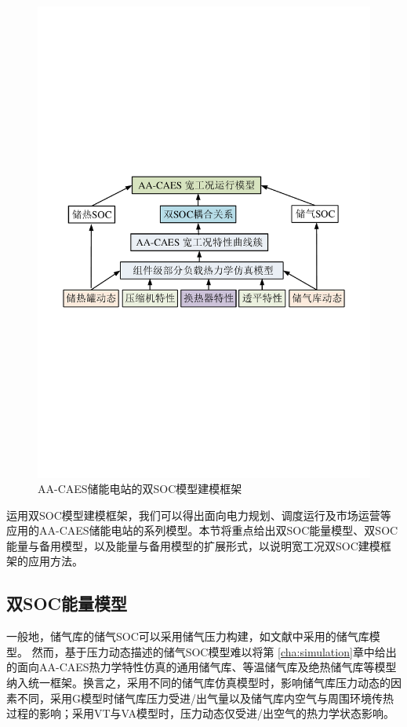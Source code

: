 \begin{figure}[H] %
  \centering
  \includegraphics[scale=0.60]{figures/Chap3-2-AA-CAES-Part-Load-Model.pdf}
  \caption{AA-CAES储能电站的双SOC模型建模框架}
  \label{fig:AA-CAES-Part-Load-Model}
\end{figure}

运用双SOC模型建模框架，我们可以得出面向电力规划、调度运行及市场运营等应用的AA-CAES储能电站的系列模型。本节将重点给出双SOC能量模型、双SOC能量与备用模型，以及能量与备用模型的扩展形式，以说明宽工况双SOC建模框架的应用方法。

\subsection{双SOC能量模型}
\label{sec:dual-SOC-energy}
一般地，储气库的储气SOC可以采用储气压力构建，如文献中采用的储气库模型。 然而，基于压力动态描述的储气SOC模型难以将第
\ref{cha:simulation}章中给出的面向AA-CAES热力学特性仿真的通用储气库、等温储气库及绝热储气库等模型纳入统一框架。换言之，采用不同的储气库仿真模型时，影响储气库压力动态的因素不同，采用G模型时储气库压力受进/出气量以及储气库内空气与周围环境传热过程的影响；采用VT与VA模型时，压力动态仅受进/出空气的热力学状态影响。

